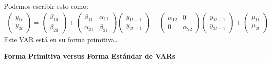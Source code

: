 	Podemos escribir esto como:\\
	\begin{gather*}
	\begin{pmatrix} y_{1t} \\ y_{2t} \end{pmatrix}
	=
	\begin{pmatrix} \beta_{10} \\ \beta_{20} \end{pmatrix}
	+
	\begin{pmatrix} \beta_{11} & \alpha_{11} \\ \alpha_{21} & \beta_{21} \end{pmatrix}
	\begin{pmatrix} y_{1t-1} \\ y_{2t-1} \end{pmatrix}
	+
	\begin{pmatrix} \alpha_{12} & 0 \\ 0 & \alpha_{22} \end{pmatrix}
	\begin{pmatrix} y_{1t-1} \\ y_{2t-1} \end{pmatrix}
	+
	\begin{pmatrix} \mu_{1t} \\ \mu_{2t} \end{pmatrix}
	\end{gather*}
	Este VAR est\'a en su forma primitiva….
	
%	
	\textbf{Forma Primitiva versus Forma Estándar de VARs}
	
